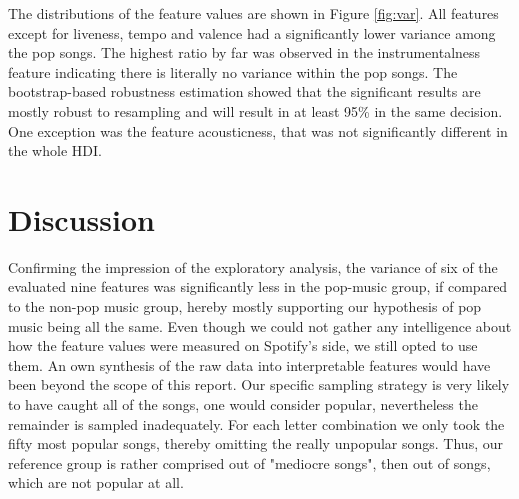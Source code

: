 \documentclass{article}
\begin{document}
The distributions of the feature values are shown in Figure \ref{fig:var}. All features except for liveness, tempo and valence had a significantly lower variance among the pop songs. The highest ratio by far was observed in the instrumentalness feature indicating there is literally no variance within the pop songs.
The bootstrap-based robustness estimation showed that the significant results are mostly robust to resampling and will result in at least 95\% in the same decision. One exception was the feature acousticness, that was not significantly different in the whole HDI.

\section{Discussion}
Confirming the impression of the exploratory analysis, the variance of six of the evaluated nine features was significantly less in the pop-music group, if compared to the non-pop music group, hereby mostly supporting our hypothesis of pop music being all the same.
Even though we could not gather any intelligence about how the feature values were measured on Spotify's side, we still opted to use them. An own synthesis of the raw data into interpretable features would have been beyond the scope of this report. 
Our specific sampling strategy is very likely to have caught all of the songs, one would consider popular, nevertheless the remainder is sampled inadequately. For each letter combination we only took the fifty most popular songs, thereby omitting the really unpopular songs. Thus, our reference group is rather comprised out of "mediocre songs", then out of songs, which are not popular at all.   
\end{document}
